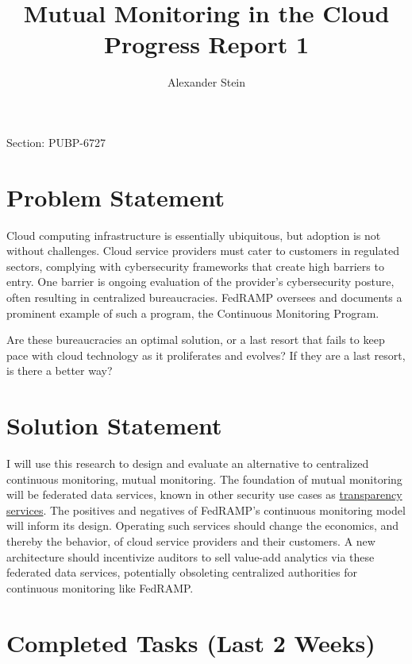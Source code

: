 \documentclass{jdf}
\begin{document}
Section: PUBP-6727
\title{Mutual Monitoring in the Cloud \\ Progress Report 1}
\author{Alexander Stein}

\maketitle
\thispagestyle{fancy}


\section*{Problem Statement}

Cloud computing infrastructure is essentially ubiquitous, but adoption is not without challenges. Cloud service providers must cater to customers in regulated sectors, complying with cybersecurity frameworks that create high barriers to entry. One barrier is ongoing evaluation of the provider's cybersecurity posture, often resulting in centralized bureaucracies. FedRAMP oversees and documents a prominent example of such a program, the Continuous Monitoring Program.

Are these bureaucracies an optimal solution, or a last resort that fails to keep pace with cloud technology as it proliferates and evolves? If they are a last resort, is there a better way?

\section*{Solution Statement}

I will use this research to design and evaluate an alternative to centralized continuous monitoring, mutual monitoring. The foundation of mutual monitoring will be federated data services, known in other security use cases as \hyperlink{https://transparency.dev}{transparency services}. The positives and negatives of FedRAMP's continuous monitoring model will inform its design. Operating such services should change the economics, and thereby the behavior, of cloud service providers and their customers. A new architecture should incentivize auditors to sell value-add analytics via these federated data services, potentially obsoleting centralized authorities for continuous monitoring like FedRAMP.

\section*{Completed Tasks (Last 2 Weeks)}
\end{document}
